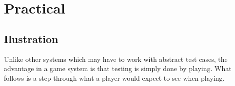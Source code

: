 \documentclass[12pt]{article} %
\begin{document}

\section{Practical}

\subsection{Ilustration}

Unlike other systems which may have to work with abstract test cases, the advantage in a game system is that testing is simply done by playing. What follows is a step through what a player would expect to see when playing. 
\end{document}
